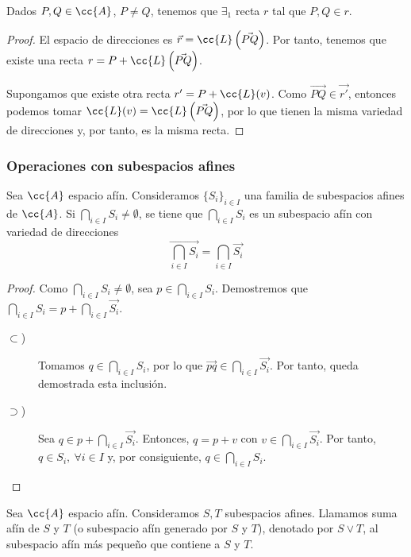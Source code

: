 \begin{prop}
    Dados $P,Q\in \cc{A}$, $P\neq Q$, tenemos que $\exists_1$ recta $r$ tal que $P,Q\in r$.
\end{prop}
\begin{proof}
    El espacio de direcciones es $\vec{r}=\cc{L}\left(\vec{PQ}\right)$. Por tanto, tenemos que existe una recta $r=P+\cc{L}\left(\vec{PQ}\right)$.

    Supongamos que existe otra recta $r'=P+\cc{L}(v)$. Como $\vec{PQ}\in \vec{r'}$, entonces podemos tomar $\cc{L}(v)=\cc{L}\left(\vec{PQ}\right)$, por lo que tienen la misma variedad de direcciones y, por tanto, es la misma recta.
\end{proof}


\subsubsection{Operaciones con subespacios afines}
\begin{prop}[Intersección]
    Sea $\cc{A}$ espacio afín. Consideramos $\{S_i\}_{i\in I}$ una familia de subespacios afines de $\cc{A}$. Si $\bigcap\limits_{i\in I}S_i\neq \emptyset$, se tiene que $\bigcap\limits_{i\in I}S_i$ es un subespacio afín con variedad de direcciones
    \begin{equation*}
        \vec{\bigcap\limits_{i\in I}S_i} = \bigcap\limits_{i\in I}\vec{S_i}
    \end{equation*}
\end{prop}
\begin{proof}
    Como $\bigcap\limits_{i\in I}S_i\neq \emptyset$, sea $p\in \bigcap\limits_{i\in I}S_i$. Demostremos que $\bigcap\limits_{i\in I}S_i=p+\bigcap\limits_{i\in I}\vec{S_i}$.

    \begin{description}
        \item[$\subset$)]
        Tomamos $q\in \bigcap\limits_{i\in I}S_i$, por lo que $\vec{pq}\in \bigcap\limits_{i\in I}\vec{S_i}$. Por tanto, queda demostrada esta inclusión.
        
        \item[$\supset$)] Sea $q\in p+\bigcap\limits_{i\in I}\vec{S_i}$. Entonces, $q=p+v$ con $v\in \bigcap\limits_{i\in I}\vec{S_i}$. Por tanto, $q\in S_i,~\forall i\in I$ y, por consiguiente, $q\in \bigcap\limits_{i\in I}S_i$.
    \end{description}
\end{proof}


\begin{definicion}
    Sea $\cc{A}$ espacio afín. Consideramos $S,T$ subespacios afines.
    Llamamos suma afín de $S$ y $T$ (o subespacio afín generado por $S$ y $T$), denotado por $S\vee T$, al subespacio afín más pequeño que contiene a $S$ y $T$.
\end{definicion}

